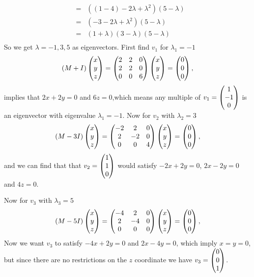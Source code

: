 {\begin{eqnarray*}
&=&((1-4 )-2\lambda +\lambda^2)(5-\lambda)\\
&=&(-3-2\lambda +\lambda^2)(5-\lambda)\\
&=&(1+\lambda)(3-\lambda)(5-\lambda)\\
\end{eqnarray*}
So we get $\lambda = -1, 3, 5$ as eigenvectors. First find $v_1$ for $\lambda_1 = -1$
\[
(M+I)\begin{pmatrix} x\\y\\z \end{pmatrix}
=
 \begin{pmatrix}
2 &2 & 0 \\
2 & 2& 0 \\
0& 0 & 6 \\
\end{pmatrix}
\begin{pmatrix} x\\y\\z \end{pmatrix}
= \begin{pmatrix} 0\\0\\0 \end{pmatrix},
\]
implies that $2x+2y= 0$ and $6z = 0$,which means any multiple of  $v_1 = \begin{pmatrix} 1\\-1\\0 \end{pmatrix}$ is an eigenvector with eigenvalue $\lambda_1 = -1$.
Now for $v_2$ with $\lambda_2 = 3$
\[
(M-3I)\begin{pmatrix} x\\y\\z \end{pmatrix}
=
 \begin{pmatrix}
-2 &2 & 0 \\
2 & -2& 0 \\
0& 0 & 4 \\
\end{pmatrix}
\begin{pmatrix} x\\y\\z \end{pmatrix}
= \begin{pmatrix} 0\\0\\0 \end{pmatrix},
\]
and we can find that that $v_2 = \begin{pmatrix} 1\\1\\0 \end{pmatrix}$ would satisfy  $-2x+2y= 0$,  $2x-2y= 0$ and $4z = 0$.

Now for $v_3$ with $\lambda_3 = 5$
\[
(M-5I)\begin{pmatrix} x\\y\\z \end{pmatrix}
=
 \begin{pmatrix}
-4 &2 & 0 \\
2 & -4& 0 \\
0& 0 & 0  \\
\end{pmatrix}
\begin{pmatrix} x\\y\\z \end{pmatrix}
= \begin{pmatrix} 0\\0\\0 \end{pmatrix},
\]
Now we want $v_3$ to satisfy $-4 x+ 2y = 0$ and  $2 x-4 y = 0$, which imply $x=y=0$, but since there are no restrictions on the $z$ coordinate we have $v_3 = \begin{pmatrix} 0\\0\\1 \end{pmatrix}$.

}
